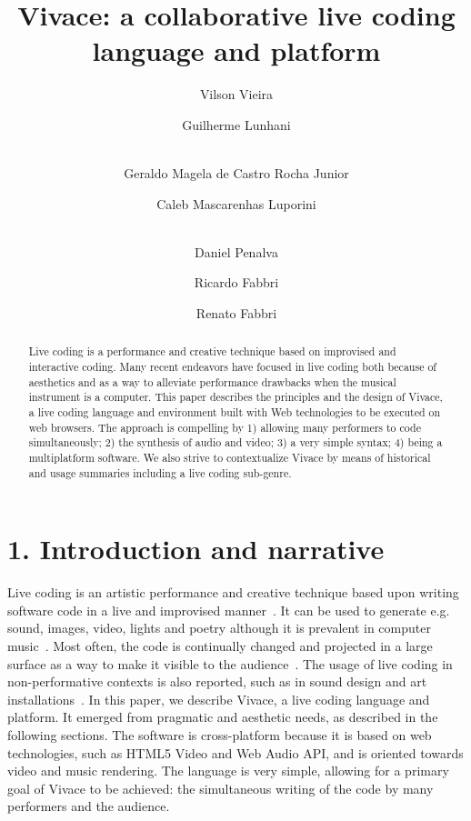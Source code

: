 \documentclass[12pt,times,twocolumn]{article}
\title{Vivace: a collaborative live coding language and platform}
\author{Vilson Vieira\inst{1}\and Guilherme Lunhani\and\\ Geraldo Magela de Castro
  Rocha Junior\and Caleb Mascarenhas Luporini\and\\ Daniel Penalva\and Ricardo
  Fabbri\inst{2}\and Renato Fabbri\inst{3}}
\begin{document}
\maketitle

\begin{abstract}
Live coding is a performance and creative technique based on improvised and interactive coding.
Many recent endeavors have focused in live coding both because of aesthetics
and as a way to alleviate performance drawbacks when the musical instrument is a computer.
This paper describes the principles and the design of Vivace, a live
coding language and environment built with Web technologies to be
executed on web browsers.
The approach is compelling by 1) allowing many performers to code simultaneously;
2) the synthesis of audio and video;
3) a very simple syntax;
4) being a multiplatform software.
We also strive to contextualize Vivace by means
of historical and usage summaries including a live coding sub-genre. 
\end{abstract}

\section{1. Introduction and narrative}
Live coding is an artistic performance and creative technique
based upon writing software code in a live and improvised manner~\cite{nilson2007live}.
It can be used to generate e.g. sound, images, video, lights and poetry
although it is prevalent in computer music~\cite{eff}.
Most often, the code is continually changed and projected in a large surface as a way to
make it visible to the audience~\cite{collins2011live}.
The usage of live coding in non-performative contexts is also reported,
such as in sound design and art installations~\cite{eff}.
In this paper, we describe Vivace, a live coding language and platform.
It emerged from pragmatic and aesthetic needs, as described in the following sections.
The software is cross-platform because it is based on web technologies,
such as HTML5 Video and Web Audio API, and is oriented towards video and music rendering.
The language is very simple, allowing for a primary goal of
Vivace to be achieved: the simultaneous writing of the code by many performers
and the audience.
\end{document}
